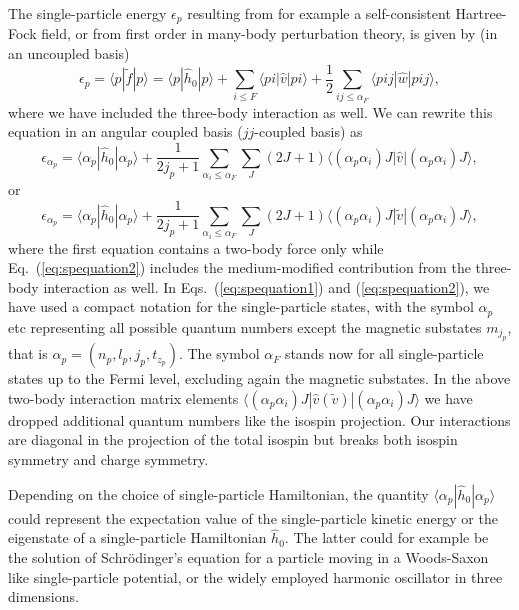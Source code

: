 \documentclass[aps,showpacs,floatfix,nofootinbib,preprintnumbers,superscriptaddress,amsmath,amssymb]{revtex4-1}
\begin{document}
The single-particle energy $\epsilon_p$ resulting from for example a self-consistent Hartree-Fock field, 
or from  first order in many-body perturbation theory, is given by (in an uncoupled basis)
\[
\epsilon_p=\langle p| \tilde{f}|p\rangle = \langle p|\hat{h}_0|p\rangle +\sum_{i\le F} \langle pi|\hat{v}|pi\rangle+\frac{1}{2}\sum_{ij\le\alpha_F} \langle pij|\hat{w}|pij\rangle,
\]
where we have included the three-body interaction as well.
We can rewrite this equation in an angular coupled basis ($jj$-coupled basis) as 
\begin{equation}
\epsilon_{\alpha_p}= \langle \alpha_p|\hat{h}_0|\alpha_p\rangle+\frac{1}{2j_p+1}\sum_{\alpha_i\le \alpha_F}\sum_{J} (2J+1)\langle (\alpha_p\alpha_i)J | \hat{v} | (\alpha_p\alpha_i)J \rangle,
\label{eq:spequation1}
\end{equation}
or
\begin{equation}
\epsilon_{\alpha_p}= \langle \alpha_p|\hat{h}_0|\alpha_p\rangle+\frac{1}{2j_p+1}\sum_{\alpha_i\le \alpha_F}\sum_{J} (2J+1)\langle (\alpha_p\alpha_i)J | \tilde{v} | (\alpha_p\alpha_i)J \rangle,
\label{eq:spequation2}
\end{equation}
where the first equation contains a two-body force only while
Eq.~(\ref{eq:spequation2}) includes the medium-modified contribution
from the three-body interaction as well. In
Eqs.~(\ref{eq:spequation1}) and (\ref{eq:spequation2}), we have
used a compact notation for the single-particle states, with the
symbol $\alpha_p$ etc representing all possible quantum numbers except
the magnetic substates $m_{j_p}$, that is $\alpha_p=(n_p,l_p,j_p,t_{z_p})$. The symbol $\alpha_F$ stands now for
all single-particle states up to the Fermi level, excluding again the
magnetic substates.  In the above two-body interaction matrix elements
$\langle (\alpha_p\alpha_i)J | \hat{v}(\tilde{v}) |(\alpha_p\alpha_i)J \rangle$ we have dropped additional quantum
numbers like the isospin projection. Our interactions are diagonal in
the projection of the total isospin but breaks both isospin symmetry
and charge symmetry.

Depending on the choice of single-particle Hamiltonian, the quantity
$\langle \alpha_p|\hat{h}_0|\alpha_p\rangle$ could represent the expectation value of the single-particle
kinetic energy or the eigenstate of a single-particle Hamiltonian
$\hat{h}_0$. The latter could for example be the solution of
Schr\"odinger's equation for a particle moving in a Woods-Saxon like
single-particle potential, or the widely employed harmonic oscillator
in three dimensions.
\end{document}
